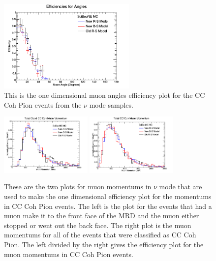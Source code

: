 \documentclass[11pt]{article}
\begin{document}
\begin{figure}[H]
\centering
\includegraphics[width=0.6\textwidth]{NMCombinedPlotsImages/24-NMCombinedPlots.png}
\caption{This is the one dimensional muon angles efficiency plot for the CC Coh Pion events from the $\nu$ mode samples.}
\end{figure}

\begin{figure}[H]
\centering
\includegraphics[width=0.4\textwidth]{NMCombinedPlotsImages/15-NMCombinedPlots.png}
\includegraphics[width=0.4\textwidth]{NMCombinedPlotsImages/17-NMCombinedPlots.png}
\caption{These are the two plots for muon momentums in $\nu$ mode that are used to make the one dimensional efficiency plot for the momentums in CC Coh Pion events. The left is the plot for the events that had a muon make it to the front face of the MRD and the muon either stopped or went out the back face. The right plot is the muon momentums for all of the events that were classified as CC Coh Pion. The left divided by the right gives the efficiency plot for the muon momentums in CC Coh Pion events.}
\end{figure}
\end{document}
